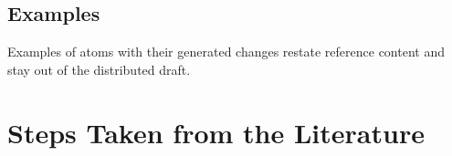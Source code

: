 \begin{table}[tp]
  \caption{Contaminated development runs before the fixes, a debugging history, not results: every proposer, %
    repairer and judge prompt printed each atom's source reference, the case and the section of the published
    profile. Base \acs{DCAT-AP}~1.1; the engine before \acs{DCAT}-state pinning (two code versions, an earlier %
    one for run~1). Runs 1--3: gpt-oss-120b, judge on, one vote, at most three repair rounds, one call at a time; %
    rules: the offline rules provider. %
    No person reviewed anything: every included change is a machine decision. Atoms and %
    extension rate as in Sect.~\ref{sec:setup}; all warnings from C7. Calls: in parentheses, cached answers; %
    run~2 replayed unchanged prompts, run~3 had a fresh store. Rules runs: kinds not recorded (--).} %
  \label{tab:pilot}
  \centering\scriptsize
  
\end{table}

\subsection{Examples}\label{app:examples}

Examples of atoms with their generated changes restate reference content and stay out of the distributed draft.

\section{Steps Taken from the Literature}\label{app:steps}

